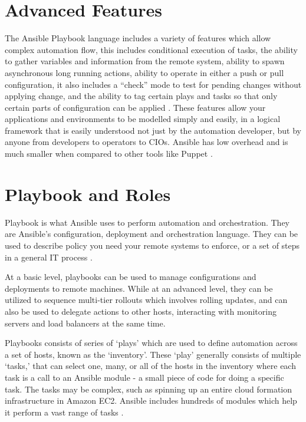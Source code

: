 \documentclass[9pt,twocolumn,twoside]{styles/osajnl}
\begin{document}
\section{Advanced Features}

The Ansible Playbook language includes a variety of features which
allow complex automation flow, this includes conditional execution of
tasks, the ability to gather variables and information from the remote
system, ability to spawn asynchronous long running actions, ability to
operate in either a push or pull configuration, it also includes a
“check” mode to test for pending changes without applying change, and
the ability to tag certain plays and tasks so that only certain parts
of configuration can be applied \cite{www-ansible3}. These features allow your
applications and environments to be modelled simply and easily, in a
logical framework that is easily understood not just by the automation
developer, but by anyone from developers to operators to CIOs. Ansible
has low overhead and is much smaller when compared to other tools like
Puppet \cite{www-ansible4}.

\section{Playbook and Roles}

Playbook is what Ansible uses to perform automation and
orchestration. They are Ansible's configuration, deployment and
orchestration language. They can be used to describe policy you need
your remote systems to enforce, or a set of steps in a general IT
process \cite{www-ansible5}.

At a basic level, playbooks can be used to manage configurations and
deployments to remote machines. While at an advanced level, they can
be utilized to sequence multi-tier rollouts which involves rolling
updates, and can also be used to delegate actions to other hosts,
interacting with monitoring servers and load balancers at the same time.

Playbooks consists of series of ‘plays’ which are used to define
automation across a set of hosts, known as the ‘inventory’. These
‘play’ generally consists of multiple ‘tasks,’ that can select one,
many, or all of the hosts in the inventory where each task is a call
to an Ansible module - a small piece of code for doing a specific
task. The tasks may be complex, such as spinning up an entire cloud
formation infrastructure in Amazon EC2. Ansible includes hundreds of
modules which help it perform a vast range of
tasks \cite{www-ansible}.
\end{document}
